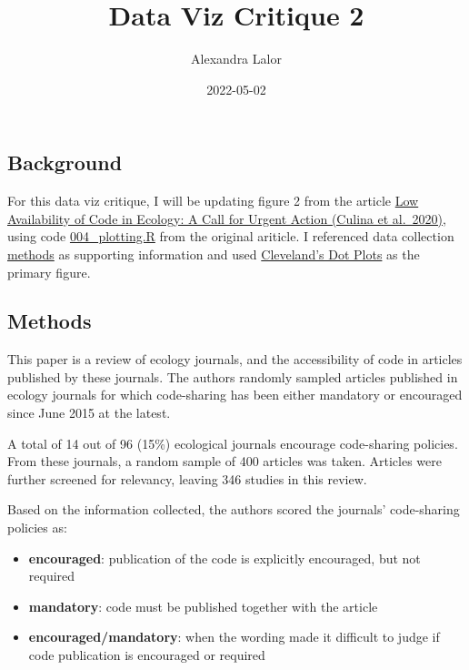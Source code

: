 \documentclass[
]{article}
\title{Data Viz Critique 2}
\author{Alexandra Lalor}
\date{2022-05-02}
\providecommand{\tightlist}{%
  \setlength{\itemsep}{0pt}\setlength{\parskip}{0pt}}
\begin{document}
\maketitle

\hypertarget{background}{%
\subsection{Background}\label{background}}

For this data viz critique, I will be updating figure 2 from the article
\href{https://journals.plos.org/plosbiology/article?id=10.1371/journal.pbio.3000763}{Low
Availability of Code in Ecology: A Call for Urgent Action (Culina et
al.~2020)}, using code
\href{https://zenodo.org/record/3833928\#.Ym9XNNrMI2w}{004\_plotting.R}
from the original ariticle. I referenced data collection
\href{https://asanchez-tojar.github.io/code_in_ecology/supporting_information.html}{methods}
as supporting information and used
\href{https://rpkgs.datanovia.com/ggpubr/reference/ggdotchart.html}{Cleveland's
Dot Plots} as the primary figure.

\hypertarget{methods}{%
\subsection{Methods}\label{methods}}

This paper is a review of ecology journals, and the accessibility of
code in articles published by these journals. The authors randomly
sampled articles published in ecology journals for which code-sharing
has been either mandatory or encouraged since June 2015 at the latest.

A total of 14 out of 96 (15\%) ecological journals encourage
code-sharing policies. From these journals, a random sample of 400
articles was taken. Articles were further screened for relevancy,
leaving 346 studies in this review.

Based on the information collected, the authors scored the journals'
code-sharing policies as:

\begin{itemize}
\tightlist
\item
  \textbf{encouraged}: publication of the code is explicitly encouraged,
  but not required
\item
  \textbf{mandatory}: code must be published together with the article
\item
  \textbf{encouraged/mandatory}: when the wording made it difficult to
  judge if code publication is encouraged or required
\end{itemize}
\end{document}
